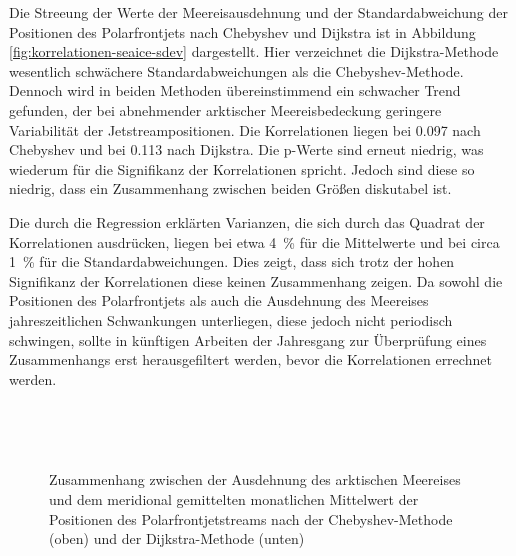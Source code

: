 Die Streeung der Werte der Meereisausdehnung und der Standardabweichung der Positionen des Polarfrontjets nach Chebyshev und Dijkstra ist in Abbildung \ref{fig:korrelationen-seaice-sdev} dargestellt. Hier verzeichnet die Dijkstra-Methode wesentlich schwächere Standardabweichungen als die Chebyshev-Methode. Dennoch wird in beiden Methoden übereinstimmend ein schwacher Trend gefunden, der bei abnehmender arktischer Meereisbedeckung geringere Variabilität der Jetstreampositionen. Die Korrelationen liegen bei \num{0.097} nach Chebyshev und bei \num{0.113} nach Dijkstra. Die p-Werte sind erneut niedrig, was wiederum für die Signifikanz der Korrelationen spricht. Jedoch sind diese so niedrig, dass ein Zusammenhang zwischen beiden Größen diskutabel ist.

Die durch die Regression erklärten Varianzen, die sich durch das Quadrat der Korrelationen ausdrücken, liegen bei etwa \SI{4}{\percent} für die Mittelwerte und bei circa \SI{1}{\percent} für die Standardabweichungen. Dies zeigt, dass sich trotz der hohen Signifikanz der Korrelationen diese keinen Zusammenhang zeigen. Da sowohl die Positionen des Polarfrontjets als auch die Ausdehnung des Meereises jahreszeitlichen Schwankungen unterliegen, diese jedoch nicht periodisch schwingen, sollte in künftigen Arbeiten der Jahresgang zur Überprüfung eines Zusammenhangs erst herausgefiltert werden, bevor die Korrelationen errechnet werden. 

\begin{figure} %
  \centering
  \begin{minipage}{\textwidth}
    \centering
  \end{minipage} \\ 
  \begin{minipage}{\textwidth}
    \centering
  \end{minipage} \\ 
  \caption[Korrelationen zwischen Ausdehnung des Meereises und Mittelwert der Positionen des Polarfrontjets]{Zusammenhang zwischen der Ausdehnung des arktischen Meereises und dem meridional gemittelten monatlichen Mittelwert der Positionen des Polarfrontjetstreams nach der Chebyshev-Methode (oben) und der Dijkstra-Methode (unten)} \label{fig:korrelationen-seaice-mean}
\end{figure}

